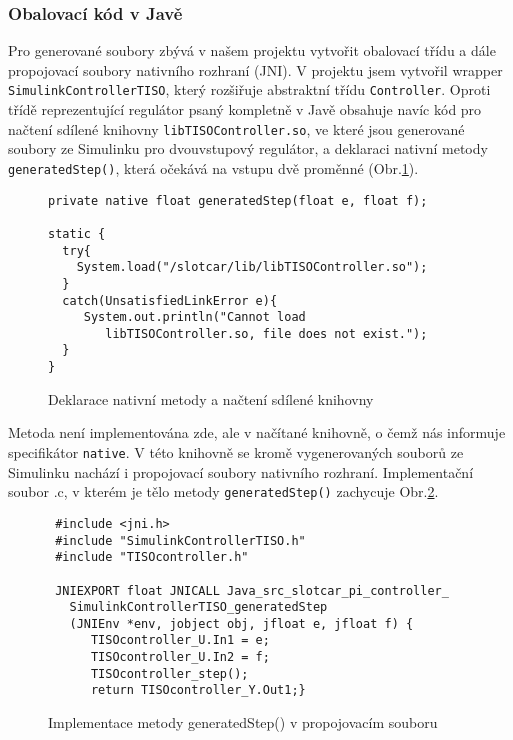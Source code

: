 \documentclass[thesis=M,czech,hidelinks]{FITthesis}[2012/06/26]
\begin{document}
\subsubsection*{Obalovací kód v Javě}
Pro generované soubory zbývá v našem projektu vytvořit obalovací třídu a dále propojovací soubory nativního rozhraní (JNI). V projektu jsem vytvořil wrapper \texttt{SimulinkControllerTISO}, který rozšiřuje abstraktní třídu \texttt{Controller}. Oproti třídě reprezentující regulátor psaný kompletně v Javě obsahuje navíc kód pro načtení sdílené knihovny \texttt{libTISOController.so}, ve které jsou generované soubory ze Simulinku pro dvouvstupový regulátor, a deklaraci nativní metody \texttt{generatedStep()}, která očekává na vstupu dvě proměnné (Obr.\ref{fig:TISO.java}). 
\begin{figure}[h]               
  \begin{verbatim}
private native float generatedStep(float e, float f);
  
static {
  try{
    System.load("/slotcar/lib/libTISOController.so");
  }
  catch(UnsatisfiedLinkError e){
     System.out.println("Cannot load
        libTISOController.so, file does not exist.");
  }
} 
  \end{verbatim}      
  \caption{Deklarace nativní metody a načtení sdílené knihovny}
  \label{fig:TISO.java}
\end{figure}

Metoda není implementována zde, ale v načítané knihovně, o čemž nás informuje specifikátor \texttt{native}. V této knihovně se kromě vygenerovaných souborů ze Simulinku nachází i propojovací soubory nativního rozhraní. Implementační soubor .c, v kterém je tělo metody \texttt{generatedStep()} zachycuje Obr.\ref{fig:TISO.c}. 
 \begin{figure}[h]           
   \begin{verbatim}
 #include <jni.h>   
 #include "SimulinkControllerTISO.h"  
 #include "TISOcontroller.h"
 
 JNIEXPORT float JNICALL Java_src_slotcar_pi_controller_
   SimulinkControllerTISO_generatedStep
   (JNIEnv *env, jobject obj, jfloat e, jfloat f) {
      TISOcontroller_U.In1 = e;
      TISOcontroller_U.In2 = f;
      TISOcontroller_step();
      return TISOcontroller_Y.Out1;} 
   \end{verbatim}      
   \caption{Implementace metody generatedStep() v propojovacím souboru}
   \label{fig:TISO.c}
 \end{figure}
 
\end{document}
